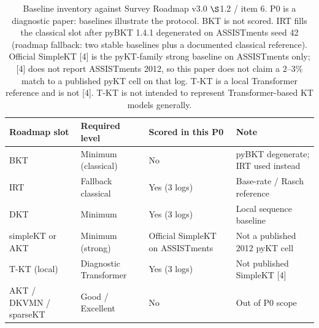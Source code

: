 \begin{table}[htbp]
\caption{Baseline inventory against Survey Roadmap v3.0 $\S$1.2 / item 6. P0 is a diagnostic paper: baselines illustrate the protocol. BKT is not scored. IRT fills the classical slot after pyBKT 1.4.1 degenerated on ASSISTments seed 42 (roadmap fallback: two stable baselines plus a documented classical reference). Official SimpleKT [4] is the pyKT-family strong baseline on ASSISTments only; [4] does not report ASSISTments 2012, so this paper does not claim a $2$--$3\%$ match to a published pyKT cell on that log. T-KT is a local Transformer reference and is not [4]. T-KT is not intended to represent Transformer-based KT models generally.}
\label{tab:s9_baseline_inventory}
\centering
\small
\begin{tabular}{llll}
\toprule
Roadmap slot & Required level & Scored in this P0 & Note \\
\midrule
BKT & Minimum (classical) & No & pyBKT degenerate; IRT used instead \\
IRT & Fallback classical & Yes (3 logs) & Base-rate / Rasch reference \\
DKT & Minimum & Yes (3 logs) & Local sequence baseline \\
simpleKT or AKT & Minimum (strong) & Official SimpleKT on ASSISTments & Not a published 2012 pyKT cell \\
T-KT (local) & Diagnostic Transformer & Yes (3 logs) & Not published SimpleKT [4] \\
AKT / DKVMN / sparseKT & Good / Excellent & No & Out of P0 scope \\
\bottomrule
\end{tabular}
\end{table}
